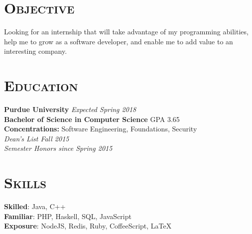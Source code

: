 
\hypersetup{backref,pdfpagemode=Full,colorlinks=true,backref}

\addtolength{\oddsidemargin}{-0.45in}
\addtolength{\voffset}{-0.20in}
\addtolength{\textwidth}{0.85in} 
\addtolength{\textheight}{1.00in}

\renewcommand{\namefont}{\LARGE\emph}




\address{ryndvs96@gmail.com \ \ \ \ \ github.com/ryndvs96}
\begin{resume}


\section{\textsc{Objective}}

Looking for an internship that will take advantage of my programming abilities, help me to grow as a software developer, and enable me to add value to an interesting company.


\section{\textsc{Education}}

\textbf{Purdue University} \hfill \emph{Expected Spring 2018} \\
\textbf{Bachelor of Science in Computer Science} \hfill GPA 3.65\\
\textbf{Concentrations:} Software Engineering, Foundations, Security\\
\emph{Dean's List Fall 2015}\\
\emph{Semester Honors since Spring 2015}



\section{\textsc{Skills}}

\small{\textbf{Skilled}: }\normalsize{Java, C++}\\
\small{\textbf{Familiar}: }\normalsize{PHP, Haskell, SQL, JavaScript}\\
\small{\textbf{Exposure}: }\normalsize{NodeJS, Redis, Ruby, CoffeeScript, \LaTeX}


\end{resume}
